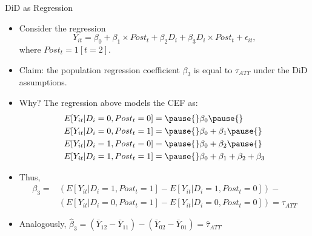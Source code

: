 \documentclass[11pt,english,handout]{beamer}
\begin{document}
\begin{frame}{DiD as Regression}
	\begin{itemize}
		\item 
		Consider the regression 
		$$Y_{it} = \beta_0 + \beta_1 \times Post_t + \beta_2 D_i + \beta_3 D_i \times Post_t + \epsilon_{it},$$
		\noindent where $Post_t = 1[t=2]$.
		
		\pause
		\item
		Claim: the population regression coefficient $\beta_3$ is equal to $\tau_{ATT}$ under the DiD assumptions.
		
		\pause
		\item
		Why? The regression above models the CEF as:
		\begin{align*}
			& E[Y_{it} | D_i = 0, Post_t = 0 ]  = \pause{}  \beta_0 \pause{} \\
			& E[Y_{it} | D_i = 0, Post_t = 1 ] = \pause{}  \beta_0 + \beta_1 \pause{} \\ 
			& E[Y_{it} | D_i = 1, Post_t = 0 ] = \pause{}  \beta_0 + \beta_2 \pause{} \\
			& E[Y_{it} | D_i = 1, Post_t = 1 ] = \pause{}  \beta_0 + \beta_1 + \beta_2 + \beta_3
		\end{align*}
	
	\pause
	\item
	Thus, 
	\begin{align*}
	\beta_3 = &(E[Y_{it} | D_i = 1, Post_t = 1 ] - E[Y_{it} | D_i = 1, Post_t = 0 ]) - \\ &(E[Y_{it} | D_i = 0, Post_t = 1 ] - E[Y_{it} | D_i = 0, Post_t = 0 ]) = \tau_{ATT}		
	\end{align*}

\pause
\item Analogously, $\hat\beta_3 = (\bar{Y}_{12} -\bar{Y}_{11}) - (\bar{Y}_{02} -\bar{Y}_{01}) = \hat\tau_{ATT}$

	\end{itemize}
\end{frame}
\end{document}
